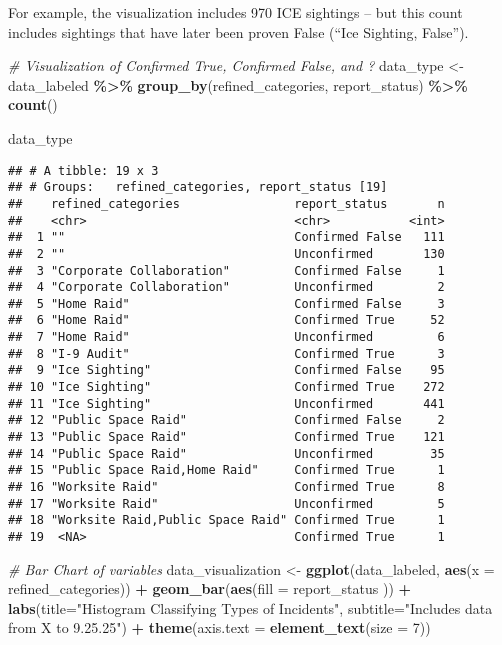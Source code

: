 \documentclass[
]{article}
\newenvironment{Shaded}{\begin{snugshade}}{\end{snugshade}}
\newcommand{\AttributeTok}[1]{\textcolor[rgb]{0.13,0.29,0.53}{#1}}
\newcommand{\CommentTok}[1]{\textcolor[rgb]{0.56,0.35,0.01}{\textit{#1}}}
\newcommand{\DecValTok}[1]{\textcolor[rgb]{0.00,0.00,0.81}{#1}}
\newcommand{\FunctionTok}[1]{\textcolor[rgb]{0.13,0.29,0.53}{\textbf{#1}}}
\newcommand{\NormalTok}[1]{#1}
\newcommand{\OtherTok}[1]{\textcolor[rgb]{0.56,0.35,0.01}{#1}}
\newcommand{\SpecialCharTok}[1]{\textcolor[rgb]{0.81,0.36,0.00}{\textbf{#1}}}
\newcommand{\StringTok}[1]{\textcolor[rgb]{0.31,0.60,0.02}{#1}}
\begin{document}
For example, the visualization includes 970 ICE sightings -- but this
count includes sightings that have later been proven False (``Ice
Sighting, False'').

\begin{Shaded}
\begin{Highlighting}[]
\CommentTok{\# Visualization of Confirmed True, Confirmed False, and ?}
\NormalTok{data\_type }\OtherTok{\textless{}{-}}\NormalTok{ data\_labeled }\SpecialCharTok{\%\textgreater{}\%}
  \FunctionTok{group\_by}\NormalTok{(refined\_categories, report\_status) }\SpecialCharTok{\%\textgreater{}\%}
  \FunctionTok{count}\NormalTok{() }

\NormalTok{data\_type}
\end{Highlighting}
\end{Shaded}

\begin{verbatim}
## # A tibble: 19 x 3
## # Groups:   refined_categories, report_status [19]
##    refined_categories                report_status       n
##    <chr>                             <chr>           <int>
##  1 ""                                Confirmed False   111
##  2 ""                                Unconfirmed       130
##  3 "Corporate Collaboration"         Confirmed False     1
##  4 "Corporate Collaboration"         Unconfirmed         2
##  5 "Home Raid"                       Confirmed False     3
##  6 "Home Raid"                       Confirmed True     52
##  7 "Home Raid"                       Unconfirmed         6
##  8 "I-9 Audit"                       Confirmed True      3
##  9 "Ice Sighting"                    Confirmed False    95
## 10 "Ice Sighting"                    Confirmed True    272
## 11 "Ice Sighting"                    Unconfirmed       441
## 12 "Public Space Raid"               Confirmed False     2
## 13 "Public Space Raid"               Confirmed True    121
## 14 "Public Space Raid"               Unconfirmed        35
## 15 "Public Space Raid,Home Raid"     Confirmed True      1
## 16 "Worksite Raid"                   Confirmed True      8
## 17 "Worksite Raid"                   Unconfirmed         5
## 18 "Worksite Raid,Public Space Raid" Confirmed True      1
## 19  <NA>                             Confirmed True      1
\end{verbatim}

\begin{Shaded}
\begin{Highlighting}[]
\CommentTok{\# Bar Chart of variables  }
\NormalTok{data\_visualization }\OtherTok{\textless{}{-}} \FunctionTok{ggplot}\NormalTok{(data\_labeled, }\FunctionTok{aes}\NormalTok{(}\AttributeTok{x =}\NormalTok{ refined\_categories)) }\SpecialCharTok{+}
   \FunctionTok{geom\_bar}\NormalTok{(}\FunctionTok{aes}\NormalTok{(}\AttributeTok{fill =}\NormalTok{ report\_status )) }\SpecialCharTok{+} 
   \FunctionTok{labs}\NormalTok{(}\AttributeTok{title=}\StringTok{"Histogram Classifying Types of Incidents"}\NormalTok{, }
       \AttributeTok{subtitle=}\StringTok{"Includes data from X to 9.25.25"}\NormalTok{) }\SpecialCharTok{+}
  \FunctionTok{theme}\NormalTok{(}\AttributeTok{axis.text =} \FunctionTok{element\_text}\NormalTok{(}\AttributeTok{size =} \DecValTok{7}\NormalTok{)) }
\end{Highlighting}
\end{Shaded}
\end{document}
